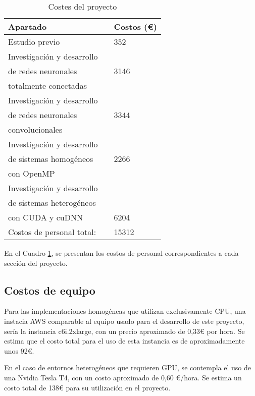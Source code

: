 \begin{table}[H]
	\centering
	\begin{tabular}{|lll|}
		\hline
		Apartado 	 &\vline  & Costos (€) \\
		\hline
		
		Estudio previo    & \vline & 352 \\			
		\hline
		Investigación y desarrollo  	 & \vline & 	\\
		de redes neuronales  	 & \vline & 3146	\\
		totalmente conectadas 	 & \vline & 	\\
		\hline
		Investigación y desarrollo    & \vline & 	 \\	
		de redes neuronales    & \vline & 3344	 \\			
		convolucionales    & \vline & 	 \\					
		\hline
		Investigación y desarrollo  	 & \vline & 	 \\
		de sistemas homogéneos  	 & \vline & 2266	 \\
		con OpenMP 	 & \vline & 	 \\
		\hline
		Investigación y desarrollo     & \vline &  	\\
		de sistemas heterogéneos    & \vline &  \\ 
		con CUDA y cuDNN    & \vline & 6204 \\ 	
		\hline
		\hline
		Costos de personal total:				& \vline & 15312 \\
		\hline
	\end{tabular}
	\caption{Costes del proyecto}
	\label{tabla_costes}
\end{table}

En el Cuadro \ref{tabla_costes}, se presentan los costos de personal correspondientes a cada sección del proyecto.

\subsection{Costos de equipo}

Para las implementaciones homogéneas que utilizan exclusivamente CPU, una instacia AWS comparable al equipo usado para el desarrollo de este proyecto, sería la instancia c6i.2xlarge, con un precio aproximado de 0,33€ por hora. Se estima que el costo total para el uso de esta instancia es de aproximadamente unos 92€.

En el caso de entornos heterogéneos que requieren GPU, se contempla el uso de una Nvidia Tesla T4, con un costo aproximado de 0,60 €/hora. Se estima un costo total de 138€ para su utilización en el proyecto.

